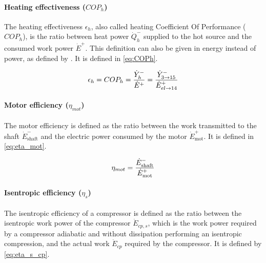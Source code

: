 \paragraph{Heating effectiveness ($COP_h$)}

The heating effectiveness $\epsilon_h$, also called heating
Coefficient Of Performance ($COP_h$), is the ratio between heat power
$\dot{Q}^{-}_h$ supplied to the hot source and the consumed work power
$\dot{E}^{+}$. This definition can also be given in energy instead of
power, as defined by \citet[p.\,641]{Borel-Favrat-2010a}. It is
defined in \cref{eq:COPh}.

\begin{equation}
  \label{eq:COPh}
  \epsilon_h = COP_h = \dfrac{\dot{Y}^{-}_h}{\dot{E}^{+}} = \dfrac{\dot{Y}^{-}_{3 \rightarrow 15}}{\dot{E}^{+}_{el \rightarrow 14}}
  \tagaddtextone{$\left[-\right]$}
\end{equation}

\paragraph{Motor efficiency ($\eta_{mot}$)}

The motor efficiency is defined as the ratio between the work
transmitted to the shaft $\dot{E}^-_{\text{shaft}}$ and the electric
power consumed by the motor $\dot{E}^+_{\text{mot}}$. It is defined in
\cref{eq:eta_mot}.

\begin{equation}
  \label{eq:eta_mot}
  \eta_{mot} = \dfrac{\dot{E}^-_{\text{shaft}}}{\dot{E}^+_{\text{mot}}}
  \tagaddtextone{$\left[-\right]$}
\end{equation}


\paragraph{Isentropic efficiency ($\eta_s$)}

The isentropic efficiency of a compressor is defined as the ratio
between the isentropic work power of the compressor $\dot{E}_{cp,s}$,
which is the work power required by a compressor adiabatic and without
dissipation performing an isentropic compression, and the actual work
$\dot{E}_{cp}$ required by the compressor. It is defined by
\cref{eq:eta_s_cp}.

